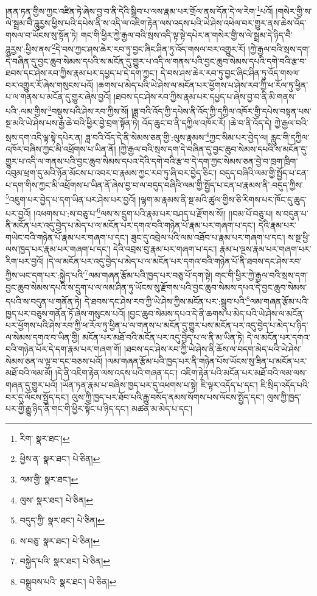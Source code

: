 །ནན་ཏན་གྱིས་ཀྱང་འཛིན་ཏེ་ཞེས་བྱ་བ་ནི་དེའི་སྒྲིབ་པ་ལས་རྣམ་པར་གྲོལ་ནས་དོན་དེ་ལ་རེག་\footnote{རིག་  སྣར་ཐང་། }པའོ། །གསེར་གྱི་ས་ལེ་སྦྲམ་བཻ་ཌཱུརྱས་ཕྱིས་པའི་དཔེས་ནི་ས་འདི་ལ་འཇིག་རྟེན་ལས་འདས་པའི་ཡེ་ཤེས་འཕེལ་བར་གྱུར་ནས་ཆེས་འོད་གསལ་བ་ཡོངས་སུ་སྟོན་ཏེ། གང་གི་ཕྱིར་ཀྱེ་རྒྱལ་བའི་སྲས་འདི་ལྟ་སྟེ་དཔེར་ན་གསེར་གྱི་ས་ལེ་སྦྲམ་དེ་ཉིད་བཻ་ཌཱུརྱས་:ཕྱིས་ནས་\footnote{ཕྱིས་ན་  སྣར་ཐང་།  པེ་ཅིན། }དེ་བས་ཀྱང་ཤས་ཆེར་རབ་ཏུ་བྱང་ཞིང་ཤིན་ཏུ་འོད་གསལ་བར་འགྱུར་རོ། །ཀྱེ་རྒྱལ་བའི་སྲས་དག་དེ་བཞིན་དུ་བྱང་ཆུབ་སེམས་དཔའི་ས་མངོན་དུ་གྱུར་པ་འདི་ལ་གནས་པའི་བྱང་ཆུབ་སེམས་དཔའི་དགེ་བའི་རྩ་བ་ཐབས་དང་ཤེས་རབ་ཀྱིས་རྣམ་པར་དཔྱད་པ་དེ་དག་ཀྱང་། དེ་བས་ཤས་ཆེར་རབ་ཏུ་བྱང་ཞིང་ཤིན་ཏུ་འོད་གསལ་བར་འགྱུར་རོ་ཞེས་གསུངས་པའོ། །ཆགས་པ་མེད་པའི་ཡེ་ཤེས་ལ་མངོན་པར་ཕྱོགས་པ་ཤེས་རབ་ཀྱི་ཕ་རོལ་ཏུ་ཕྱིན་པ་ལ་གནས་པ་མངོན་དུ་གྱུར་ཞེས་བྱའོ། །ཐབས་དང་ཤེས་རབ་ཀྱིས་རྣམ་པར་དཔྱད་པ་ཞེས་བྱ་བ་ནི་མི་གནས་པའི་:ལམ་གྱིས་\footnote{ལམ་གྱི་  སྣར་ཐང་། }བསྡུས་པའི་ཤེས་རབ་ཀྱིས་སོ། །ཟླ་བའི་འོད་ཀྱི་དཔེས་ནི་འོད་ཀྱི་དཀྱིལ་འཁོར་གྱི་དཔེས་བསྟན་པས་སྔ་མའི་ཡེ་ཤེས་པས་རྒྱ་ཆེ་བའི་ཕྱིར་བྱེ་བྲག་སྟོན་ཏེ། འོད་ཆུང་བ་ནི་དཀྱིལ་འཁོར་རོ། །ཆེ་བ་ནི་འོད་དེ། ཀྱེ་རྒྱལ་བའི་སྲས་དག་འདི་ལྟ་སྟེ་དཔེར་ན། ཟླ་བའི་འོད་དེ་ནི་སེམས་ཅན་གྱི་:ལུས་རྣམས་\footnote{ལུས་  སྣར་ཐང་།  པེ་ཅིན། }ཀྱང་སིམ་པར་བྱེད་ལ། རླུང་གི་དཀྱིལ་འཁོར་བཞིས་ཀྱང་མི་འཕྲོགས་པ་ཡིན་ནོ། །ཀྱེ་རྒྱལ་བའི་སྲས་དག་དེ་བཞིན་དུ་བྱང་ཆུབ་སེམས་དཔའི་ས་མངོན་དུ་གྱུར་པ་འདི་ལ་གནས་པའི་བྱང་ཆུབ་སེམས་དཔའ་དེའི་དགེ་བའི་རྩ་བ་དེ་དག་ཀྱང་སེམས་ཅན་བྱེ་བ་ཁྲག་ཁྲིག་འབུམ་ཕྲག་དུ་མའི་ཉོན་མོངས་པ་འབར་བ་རྣམས་ཀྱང་རབ་ཏུ་ཞི་བར་བྱེད་ཅིང་། བདུད་བཞིའི་ལམ་གྱི་སྤྱོད་པ་ངན་པ་དག་གིས་ཀྱང་མི་འཕྲོགས་པ་ཡིན་ནོ་ཞེས་བྱ་བ་ལ་བདུད་བཞིའི་ལམ་གྱི་སྤྱོད་པ་ངན་པ་རྣམས་ནི་:བདུད་ཀྱིས་\footnote{བདུད་ཀྱི་  སྣར་ཐང་།  པེ་ཅིན། }འཇུག་པར་བྱེད་པ་དག་ཡིན་པར་ཤེས་པར་བྱའོ། །ལྷག་མ་རྣམས་ནི་སྔ་མའི་ཚུལ་གྱིས་ཅི་རིགས་པར་ཁོང་དུ་ཆུད་པར་བྱའོ། །འཕགས་པ་:ས་བཅུ་པ་\footnote{ས་བཅུ་  སྣར་ཐང་།  པེ་ཅིན། }ལས་ས་དྲུག་པའི་རྣམ་པར་བཤད་པ་རྫོགས་སོ།། །།བམ་པོ་བཅུ་པ། ས་བདུན་པ་ནི་མངོན་པར་འདུ་བྱེད་པ་མེད་པ་ལ་མངོན་པར་དགའ་བའི་གཉེན་པོ་རྣམ་པར་གཞག་པ་དང་། དེའི་རྣམ་པར་གཡེང་བའི་གཉེན་པོ་རྣམ་པར་གཞག་པ་དང་། ཟུང་དུ་འབྲེལ་པའི་ལམ་འཐོབ་པ་རྣམ་པར་གཞག་པ་དང་། ས་སྔ་ཕྱི་ལས་ཁྱད་པར་རྣམ་པར་གཞག་པ་དང་། དེའི་འབྲས་བུ་རྣམ་པར་གཞག་པ་དང་། རྣམ་པ་ལྔས་རྣམ་པར་གཞག་པར་རིག་པར་བྱའོ། །དེ་ལ་མངོན་པར་འདུ་བྱེད་པ་མེད་པ་ལ་མངོན་པར་དགའ་བའི་གཉེན་པོ་ནི་ཐབས་དང་ཤེས་རབ་ཀྱིས་ཡང་དག་པར་:སྐྱེད་པའི་\footnote{བསྐྱེད་པའི་  སྣར་ཐང་།  པེ་ཅིན། }ལམ་གཞན་རྩོམ་པའི་ཁྱད་པར་བཅུ་པོ་དག་སྟེ། གང་གི་ཕྱིར་ཀྱེ་རྒྱལ་བའི་སྲས་དག་བྱང་ཆུབ་སེམས་དཔའི་ས་དྲུག་པ་ལ་ལམ་ཤིན་ཏུ་ཡོངས་སུ་རྫོགས་པའི་བྱང་ཆུབ་སེམས་དཔའ་དེ་བྱང་ཆུབ་སེམས་དཔའི་ས་བདུན་པ་གནོན་ཏེ། དེ་ཐབས་དང་ཤེས་རབ་ཀྱི་ཡེ་ཤེས་ཀྱིས་མངོན་པར་:སྒྲུབ་པའི་\footnote{བསྒྲུབས་པའི་  སྣར་ཐང་།  པེ་ཅིན། }ལམ་གཞན་རྩོམ་པའི་ཁྱད་པར་བཅུས་གནོན་ཏོ་ཞེས་གསུངས་པའོ། །བྱང་ཆུབ་སེམས་དཔའ་དེ་ནི་ཆགས་པ་མེད་པའི་ཡེ་ཤེས་ལ་མངོན་པར་ཕྱོགས་པའི་ཤེས་རབ་ཀྱི་ཕ་རོལ་ཏུ་ཕྱིན་པ་ལ་གནས་པ་མངོན་དུ་གྱུར་པས་མངོན་པར་འདུ་བྱེད་པ་མེད་པ་ཉིད་ལ་སེམས་དགའ་བ་ཡིན་གྱི། མངོན་པར་མཐོ་བའི་མངོན་པར་འདུ་བྱེད་པ་ལ་ནི་མ་ཡིན་ཏེ། དེ་ལ་མངོན་པར་དགའ་བའི་གཉེན་པོར་དེ་དག་རྣམ་པར་གཞག་གོ། །ཐབས་དང་ཤེས་རབ་ཀྱི་ཡེ་ཤེས་ནི་ཆོས་ལ་བདག་མེད་པའི་ཡེ་ཤེས་སེམས་ཅན་ལ་ལྟ་བ་དང་བཅས་པའོ། །ལམ་གཞན་རྩོམ་པའི་ཁྱད་པར་ནི་གཉེན་པོས་ཡོངས་སུ་ཟིན་པ་མངོན་པར་མཐོ་བའི་ལམ་མོ། །དེ་ནི་འཇིག་རྟེན་ལས་འདས་པའི་གཞན་དང་། འཇིག་རྟེན་པའི་མངོན་པར་མཐོ་བའི་ལམ་ལས་གཞན་དུ་གྱུར་པའོ། །ཡོན་ཏན་རྣམ་པ་བཞིས་ཁྱད་པར་དུ་འཕགས་པ་སྟེ། ཇི་ལྟར་འདོད་པ་དང་། ཇི་སྲིད་འདོད་པའི་བར་དུ་ལོངས་སྤྱོད་དང་། ལུས་ཀྱི་ཁྱད་པར་ཐོབ་པའི་རྒྱུ་བསོད་ནམས་སོགས་པས་ལོངས་སྤྱོད་དང་། ལུས་ཀྱི་ཁྱད་པར་གྱི་རྒྱུ་ཉིད་ནི་གང་གི་ཕྱིར་སྟོང་པ་ཉིད་དང་། མཚན་མ་མེད་པ་དང་། 